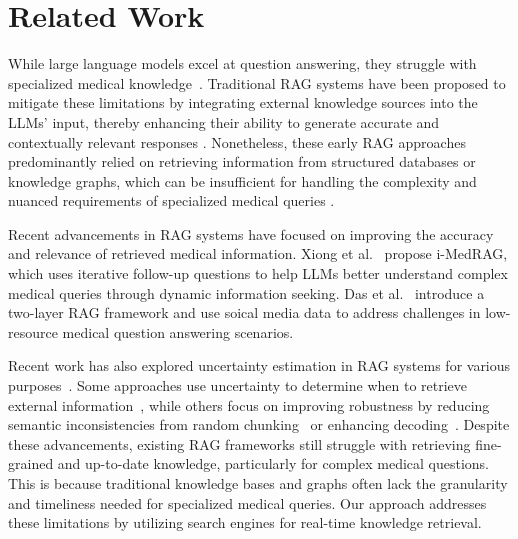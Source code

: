 \section{Related Work}
\label{related_work}
While large language models excel at question answering, they struggle with specialized medical knowledge~\cite{shi2023mededit}.
Traditional RAG systems have been proposed to mitigate these limitations by integrating external knowledge sources into the LLMs' input, thereby enhancing their ability to generate accurate and contextually relevant responses \cite{brown2020language, guu2020retrieval}. Nonetheless, these early RAG approaches predominantly relied on retrieving information from structured databases or knowledge graphs, which can be insufficient for handling the complexity and nuanced requirements of specialized medical queries \cite{jin2020disease, xiong2024benchmarking}.

Recent advancements in RAG systems have focused on improving the accuracy and relevance of retrieved medical information. 
Xiong et al.~\cite{xiong2024improving} propose i-MedRAG, which uses iterative follow-up questions to help LLMs better understand complex medical queries through dynamic information seeking.
Das et al.~\cite{das2024two} introduce a two-layer RAG framework and use soical media data to address challenges in low-resource medical question answering scenarios. 

Recent work has also explored uncertainty estimation in RAG systems for various purposes~\cite{ozaki2024understanding, li2024uncertaintyrag}. 
Some approaches use uncertainty to determine when to retrieve external information~\cite{ding2024retrieve, liu2024ctrla}, while others focus on improving robustness by reducing semantic inconsistencies from random chunking~\cite{li2024uncertaintyrag} or enhancing decoding~\cite{qiu2024entropy}. 
Despite these advancements, existing RAG frameworks still struggle with retrieving fine-grained and up-to-date knowledge, particularly for complex medical questions. 
This is because traditional knowledge bases and graphs often lack the granularity and timeliness needed for specialized medical queries.
Our approach addresses these limitations by utilizing search engines for real-time knowledge retrieval.